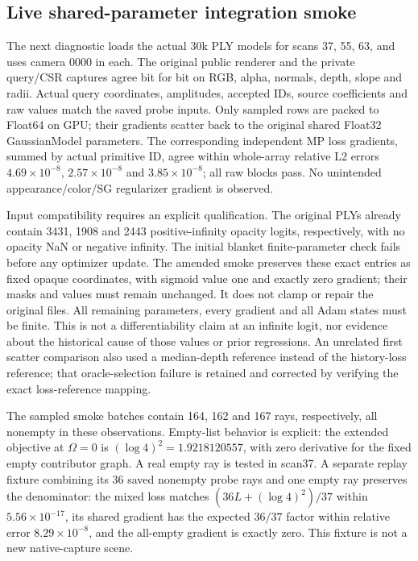 \documentclass[11pt,a4paper]{article}
\begin{document}
\subsection{Live shared-parameter integration smoke}
The next diagnostic loads the actual 30k PLY models for scans 37, 55,
63, and uses camera 0000 in each. The original public renderer and the
private query/CSR captures agree bit for bit on RGB, alpha, normals,
depth, slope and radii. Actual query coordinates, amplitudes, accepted
IDs, source coefficients and raw values match the saved probe inputs.
Only sampled rows are packed to Float64 on GPU; their gradients scatter
back to the original shared Float32 GaussianModel parameters. The
corresponding independent MP loss gradients, summed by actual primitive
ID, agree within whole-array relative L2 errors $4.69\times10^{-8}$,
$2.57\times10^{-8}$ and $3.85\times10^{-8}$; all raw blocks pass.
No unintended appearance/color/SG regularizer gradient is observed.

Input compatibility requires an explicit qualification. The original
PLYs already contain 3431, 1908 and 2443 positive-infinity opacity logits,
respectively, with no opacity NaN or negative infinity. The initial
blanket finite-parameter check fails before any optimizer update. The
amended smoke preserves these exact entries as fixed opaque coordinates,
with sigmoid value one and exactly zero gradient; their masks and values
must remain unchanged. It does not clamp or repair the original files.
All remaining parameters, every gradient and all Adam states must be
finite. This is not a differentiability claim at an infinite logit, nor
evidence about the historical cause of those values or prior regressions.
An unrelated first scatter comparison also used a median-depth reference
instead of the history-loss reference; that oracle-selection failure is
retained and corrected by verifying the exact loss-reference mapping.

The sampled smoke batches contain 164, 162 and 167 rays, respectively,
all nonempty in these observations. Empty-list behavior is explicit:
the extended objective at $\Omega=0$ is $(\log4)^2=1.9218120557$,
with zero derivative for the fixed empty contributor graph. A real
empty ray is tested in scan37. A separate replay fixture combining its
36 saved nonempty probe rays and one empty ray preserves the denominator:
the mixed loss matches $(36L+(\log4)^2)/37$ within
$5.56\times10^{-17}$, its shared gradient has the expected $36/37$
factor within relative error $8.29\times10^{-8}$, and the all-empty
gradient is exactly zero. This fixture is not a new native-capture scene.
\end{document}
